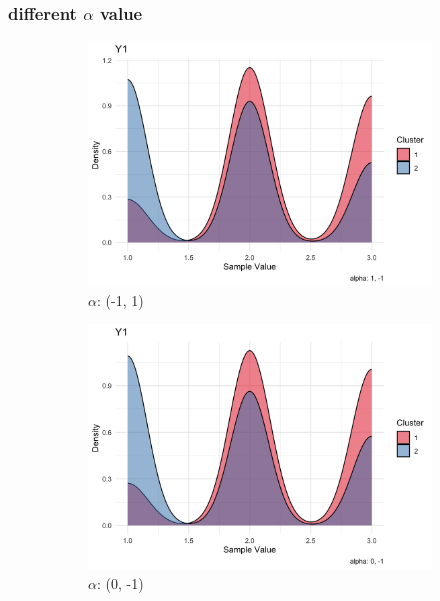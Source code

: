 \documentclass{article}
\begin{document}
\subsubsection*{different $\alpha$ value}
\begin{figure}[h]
  \centering
  \begin{subfigure}{0.3\textwidth}
      \centering
      \includegraphics[width=\textwidth]{images/alpha_-1_1.png}
      \caption{$\alpha$: (-1, 1)}
  \end{subfigure}
  \hfill
  \begin{subfigure}{0.3\textwidth}
      \centering
      \includegraphics[width=\textwidth]{images/alpha_0_-1.png}
      \caption{$\alpha$: (0, -1)}
  \end{subfigure}
  \hfill
  \begin{subfigure}{0.3\textwidth}

\end{subfigure}
\end{figure}
\end{document}
